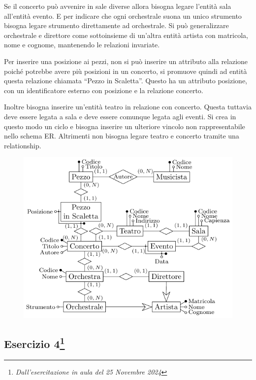 \documentclass{article}
\begin{document}
Se il concerto può avvenire in sale diverse allora bisogna legare l'entità sala all'entità evento. E per indicare che ogni orchestrale suona un unico 
strumento bisogna legare strumento direttamente ad orchestrale. 
Si può generalizzare orchestrale e direttore come sottoinsieme di un'altra entità artista con matricola, nome e cognome, mantenendo le relazioni 
invariate. 

Per inserire una posizione ai pezzi, non si può inserire un attributo alla relazione poiché potrebbe avere più posizioni in un concerto, si promuove 
quindi ad entità questa relazione chiamata ``Pezzo in Scaletta''. Questo ha un attributo posizione, con un identificatore esterno con posizione e la 
relazione concerto. 

Inoltre bisogna inserire un'entità teatro in relazione con concerto. Questa tuttavia deve essere legata a sala e deve essere comunque legata agli 
eventi. Si crea in questo modo un ciclo e bisogna inserire un ulteriore vincolo non rappresentabile nello schema ER. Altrimenti non bisogna legare teatro e concerto tramite una relationship. 


\begin{figure}[H]%
    \centering%
    \includegraphics[scale=1.25]{schema_er_es_4.pdf}%
\end{figure}

\subsection{Esercizio 4\footnote{\textit{Dall'esercitazione in aula del 25 Novembre 2024}}}
\end{document}
